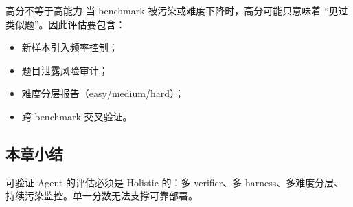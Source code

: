 \begin{warningbox}{高分不等于高能力}
当 benchmark 被污染或难度下降时，高分可能只意味着 ``见过类似题''。因此评估要包含：
\begin{itemize}
    \item 新样本引入频率控制；
    \item 题目泄露风险审计；
    \item 难度分层报告（easy/medium/hard）；
    \item 跨 benchmark 交叉验证。
\end{itemize}
\end{warningbox}

\subsection{本章小结}
可验证 Agent 的评估必须是 Holistic 的：多 verifier、多 harness、多难度分层、持续污染监控。单一分数无法支撑可靠部署。

